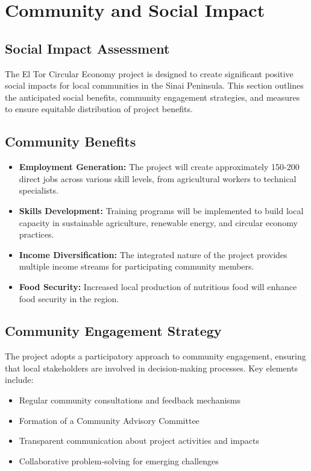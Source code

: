 \section{Community and Social Impact}

\subsection{Social Impact Assessment}

The El Tor Circular Economy project is designed to create significant positive social impacts for local communities in the Sinai Peninsula. This section outlines the anticipated social benefits, community engagement strategies, and measures to ensure equitable distribution of project benefits.

\subsection{Community Benefits}

\begin{itemize}
    \item \textbf{Employment Generation:} The project will create approximately 150-200 direct jobs across various skill levels, from agricultural workers to technical specialists.
    
    \item \textbf{Skills Development:} Training programs will be implemented to build local capacity in sustainable agriculture, renewable energy, and circular economy practices.
    
    \item \textbf{Income Diversification:} The integrated nature of the project provides multiple income streams for participating community members.
    
    \item \textbf{Food Security:} Increased local production of nutritious food will enhance food security in the region.
\end{itemize}

\subsection{Community Engagement Strategy}

The project adopts a participatory approach to community engagement, ensuring that local stakeholders are involved in decision-making processes. Key elements include:

\begin{itemize}
    \item Regular community consultations and feedback mechanisms
    \item Formation of a Community Advisory Committee
    \item Transparent communication about project activities and impacts
    \item Collaborative problem-solving for emerging challenges
\end{itemize}

